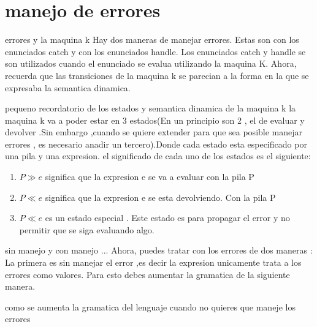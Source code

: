 \documentclass[12p]{article}
\begin{document}
\section{manejo de errores}

errores y la maquina k 
Hay dos maneras de manejar errores. Estas son con los enunciados catch y con los enunciados handle.
Los enunciados catch y handle se son utilizados cuando el enunciado se evalua utilizando la maquina K.
Ahora, recuerda que las transiciones de la maquina k se parecian a la forma en la que se expresaba la semantica dinamica.

pequeno recordatorio de los estados y semantica dinamica de la maquina k 
la maquina k va a poder estar en 3 estados(En un principio son 2 , el de evaluar y devolver .Sin embargo ,cuando se quiere extender para
que sea posible manejar errores , es necesario anadir un tercero).Donde cada estado esta especificado por una pila y una expresion. 
el significado de cada uno de los estados es el siguiente: \\ 
\begin{enumerate}

\item $ P \gg e $ significa que la expresion e se va a evaluar con la pila P
\item $ P \ll e $ significa que la expresion e se esta devolviendo. Con la pila P

\item $ P \ll e $ es un estado especial . Este estado es para propagar el error y no permitir que se siga evaluando algo.
\end{enumerate}

sin manejo y con manejo ...
Ahora, puedes tratar con los errores de dos maneras : La primera es sin manejar el error ,es decir la 
expresion unicamente trata a los errores como valores. Para esto debes aumentar la gramatica de la siguiente 
manera. 

como se aumenta la gramatica del lenguaje cuando no quieres que maneje los errores 
\end{document}
